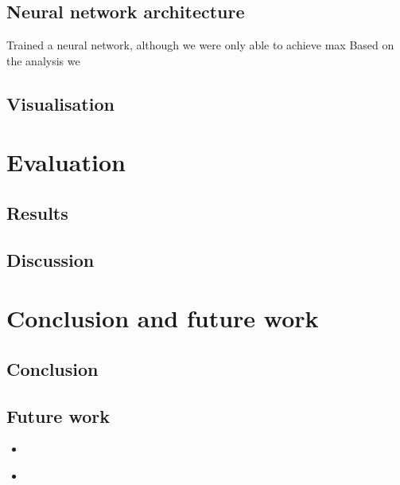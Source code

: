 \section{Neural network architecture}

Trained a neural network, although we were only able to achieve max
Based on the analysis we

\section{Visualisation}


\chapter{Evaluation}
\section{Results}
\section{Discussion}

\chapter{Conclusion and future work}
\section{Conclusion}
\section{Future work}

\begin{itemize}
	\item
\end{itemize}

\begin{itemize}
	\item 
\end{itemize}


